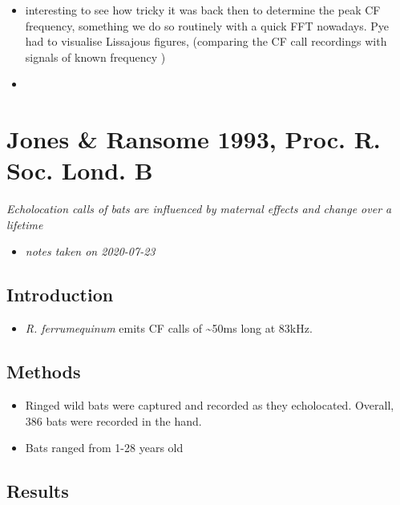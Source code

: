 \documentclass[
]{book}
\providecommand{\tightlist}{%
  \setlength{\itemsep}{0pt}\setlength{\parskip}{0pt}}
\begin{document}
\begin{itemize}
\tightlist
\item
  interesting to see how tricky it was back then to determine the peak CF frequency, something we do so routinely with a quick FFT nowadays. Pye had to visualise Lissajous figures, (comparing the CF call recordings with signals of known frequency )
\item
\end{itemize}

\hypertarget{jones-ransome-1993-proc.-r.-soc.-lond.-b}{%
\chapter{Jones \& Ransome 1993, Proc. R. Soc. Lond. B}\label{jones-ransome-1993-proc.-r.-soc.-lond.-b}}


\emph{Echolocation calls of bats are influenced by maternal effects and change over a lifetime} \citep{jonesransome1993}

\begin{itemize}
\tightlist
\item
  \emph{notes taken on 2020-07-23}
\end{itemize}

\hypertarget{introduction-3}{%
\section{Introduction}\label{introduction-3}}

\begin{itemize}
\tightlist
\item
  \emph{R. ferrumequinum} emits CF calls of \textasciitilde50ms long at 83kHz.
\end{itemize}

\hypertarget{methods-6}{%
\section{Methods}\label{methods-6}}

\begin{itemize}
\tightlist
\item
  Ringed wild bats were captured and recorded as they echolocated. Overall, 386 bats were recorded in the hand.
\item
  Bats ranged from 1-28 years old
\end{itemize}

\hypertarget{results-6}{%
\section{Results}\label{results-6}}
\end{document}
